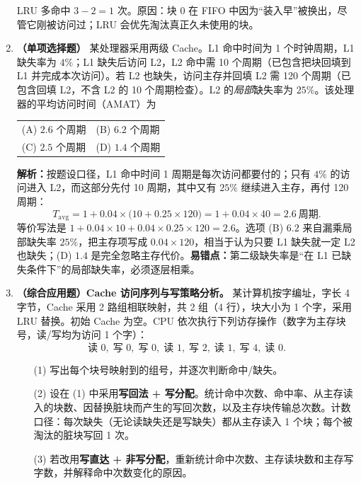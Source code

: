 \begin{enumerate}[leftmargin=*]
LRU 多命中 $3-2=1$ 次。原因：块 0 在 FIFO 中因为“装入早”被换出，尽管它刚被访问过；LRU 会优先淘汰真正久未使用的块。\else \answerarea[6] \fi

\item \textbf{（单项选择题）} 某处理器采用两级 Cache。L1 命中时间为 1 个时钟周期，L1 缺失率为 $4\%$；L1 缺失后访问 L2，L2 命中需 10 个周期（已包含把块回填到 L1 并完成本次访问）。若 L2 也缺失，访问主存并回填 L2 需 120 个周期（已包含回填 L2，不含 L2 的 10 个周期检查）。L2 的\emph{局部}缺失率为 $25\%$。该处理器的平均访问时间（AMAT）为

\begin{center}
\begin{tabular}{ll}
(A) $2.6$ 个周期 & (B) $6.2$ 个周期 \\[4pt]
(C) $2.5$ 个周期 & (D) $1.4$ 个周期
\end{tabular}
\end{center}

\ifshowsolutions\par\noindent\textbf{解析：}按题设口径，L1 命中时间 1 周期是每次访问都要付的；只有 $4\%$ 的访问进入 L2，而这部分先付 10 周期，其中又有 $25\%$ 继续进入主存，再付 120 周期：
\[
T_{\mathrm{avg}}=1+0.04\times\bigl(10+0.25\times 120\bigr)
=1+0.04\times 40=2.6\ \text{周期}.
\]
等价写法是 $1+0.04\times10+0.04\times0.25\times120=2.6$。选项 (B) $6.2$ 来自漏乘局部缺失率 $25\%$，把主存项写成 $0.04\times120$，相当于认为只要 L1 缺失就一定 L2 也缺失；(D) $1.4$ 是完全忽略主存代价。\textbf{易错点：}第二级缺失率是“在 L1 已缺失条件下”的局部缺失率，必须逐层相乘。\else \answerarea[6] \fi

\item \textbf{（综合应用题）Cache 访问序列与写策略分析。}
某计算机按字编址，字长 4 字节，Cache 采用 2 路组相联映射，共 2 组（4 行），块大小为 1 个字，采用 LRU 替换。初始 Cache 为空。CPU 依次执行下列访存操作（数字为主存块号，读/写均为访问 1 个字）：
\[
\text{读 }0,\;\text{写 }0,\;\text{写 }0,\;\text{读 }1,\;\text{写 }2,\;\text{读 }1,\;\text{写 }4,\;\text{读 }0 .
\]
\begin{enumerate}
    \item[(1)] 写出每个块号映射到的组号，并逐次判断命中/缺失。
    \item[(2)] 设在 (1) 中采用\textbf{写回法 + 写分配}。统计命中次数、命中率、从主存读入的块数、因替换脏块而产生的写回次数，以及主存块传输总次数。计数口径：每次缺失（无论读缺失还是写缺失）都从主存读入 1 个块；每个被淘汰的脏块写回 1 次。
    \item[(3)] 若改用\textbf{写直达 + 非写分配}，重新统计命中次数、主存读块数和主存写字数，并解释命中次数变化的原因。
\end{enumerate}


\end{enumerate}
